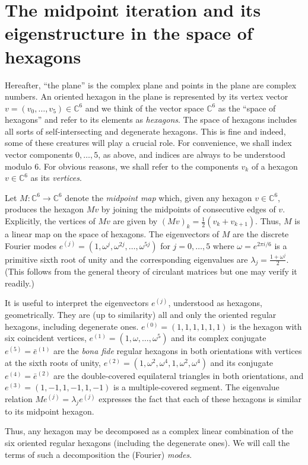\documentclass{amsart}
\newcommand*\C{\mathbb C}
\theoremstyle{definition}
\begin{document}
\section{The midpoint iteration and its eigenstructure in the space of hexagons}
\label{sec:midpoint_map_&_space_of_hexagons}
Hereafter, ``the plane'' is the complex plane and points in the plane are complex numbers. An oriented hexagon in the plane is represented by its vertex vector $v = (v_0,\dots,v_5) \in \C^6$ and we think of the vector space $\C^6$ as the ``space of hexagons'' and refer to its elements as \emph{hexagons}. The space of hexagons includes all sorts of self-intersecting and degenerate hexagons. This is fine and indeed, some of these creatures will play a crucial role. For convenience, we shall index vector components $0,\dots,5$, as above, and indices are always to be understood modulo 6. For obvious reasons, we shall refer to the components $v_k$ of a hexagon $v \in \C^6$ as its \emph{vertices}. 

Let $M : \C^6 \to \C^6$ denote the \emph{midpoint map} which, given any hexagon $v \in \C^6$, produces the hexagon $Mv$ by joining the midpoints of consecutive edges of $v$. Explicitly, the vertices of $Mv$ are given by $(Mv)_k = \frac12(v_k+v_{k+1})$. Thus, $M$ is a linear map on the space of hexagons. The eigenvectors of $M$ are the discrete Fourier modes $e^{(j)} = (1,\omega^j,\omega^{2j},\dots,\omega^{5j})$ for $j=0,\dots,5$ where $\omega = e^{2\pi i/6}$ is a primitive sixth root of unity and the corresponding eigenvalues are $\lambda_j = \frac{1+\omega^j}{2}$. (This follows from the general theory of circulant matrices but one may verify it readily.)

It is useful to interpret the eigenvectors $e^{(j)}$, understood as hexagons, geometrically. They are (up to similarity) all and only the oriented regular hexagons, including degenerate ones. $e^{(0)} = (1,1,1,1,1,1)$ is the hexagon with six coincident vertices, $e^{(1)} = (1,\omega,\dots,\omega^5)$ and its complex conjugate $e^{(5)} = \bar e^{(1)}$ are the \textit{bona fide} regular hexagons in both orientations with vertices at the sixth roots of unity, $e^{(2)} = (1,\omega^2,\omega^4,1,\omega^2,\omega^4)$ and its conjugate $e^{(4)}=\bar e^{(2)}$ are the double-covered equilateral triangles in both orientations, and $e^{(3)} = (1,-1,1,-1,1,-1)$ is a multiple-covered segment. The eigenvalue relation $Me^{(j)} = \lambda_j e^{(j)}$ expresses the fact that each of these hexagons is similar to its midpoint hexagon.

Thus, any hexagon may be decomposed as a complex linear combination of the six oriented regular hexagons (including the degenerate ones). We will call the terms of such a decomposition the (Fourier) \emph{modes}.
\end{document}
